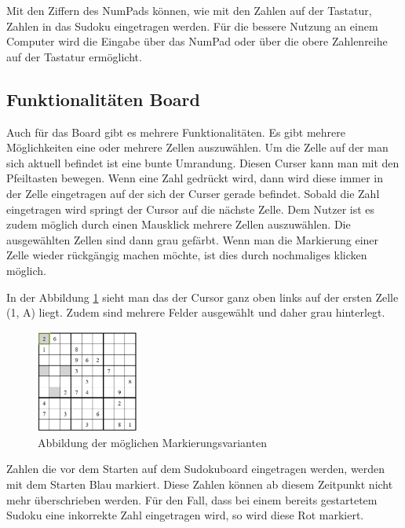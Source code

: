 Mit den Ziffern des NumPads können, wie mit den Zahlen auf der Tastatur, Zahlen in das Sudoku eingetragen werden. Für die bessere Nutzung an einem Computer wird die Eingabe über das NumPad oder über die obere Zahlenreihe auf der Tastatur ermöglicht.

\subsection{Funktionalitäten Board}
Auch für das Board gibt es mehrere Funktionalitäten. Es gibt mehrere Möglichkeiten eine oder mehrere Zellen auszuwählen. Um die Zelle auf der man sich aktuell befindet ist eine bunte Umrandung. Diesen Curser kann man mit den Pfeiltasten bewegen. Wenn eine Zahl gedrückt wird, dann wird diese immer in der Zelle eingetragen auf der sich der Curser gerade befindet. Sobald die Zahl eingetragen wird springt der Cursor auf die nächste Zelle. Dem Nutzer ist es zudem möglich durch einen Mausklick mehrere Zellen auszuwählen. Die ausgewählten Zellen sind dann grau gefärbt. Wenn man die Markierung einer Zelle wieder rückgängig machen möchte, ist dies durch nochmaliges klicken möglich. 


In der Abbildung \ref{fig:Markierungen} sieht man das der Cursor ganz oben links auf der ersten Zelle (1, A) liegt. Zudem sind mehrere Felder ausgewählt und daher grau hinterlegt.

\begin{figure}[htbp]
	\centering
	\includegraphics[width=0.3\textwidth]{images/Markierungen.png}
	\caption{Abbildung der möglichen Markierungsvarianten}
	\label{fig:Markierungen}
\end{figure}

Zahlen die vor dem Starten auf dem Sudokuboard eingetragen werden, werden mit dem Starten Blau markiert. Diese Zahlen können ab diesem Zeitpunkt nicht mehr überschrieben werden. Für den Fall, dass bei einem bereits gestartetem Sudoku eine inkorrekte Zahl eingetragen wird, so wird diese Rot markiert.


